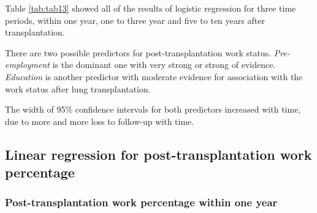 \documentclass[11pt, a4paper]{article}\usepackage[]{graphicx}\usepackage[]{color}
\begin{document}
{%
\begin{table}[ht]
\centering
\caption{Result for logistic regression 
                  for all possible periods after LTx} 
\label{tab:tab13}
\end{table}



Table \ref{tab:tab13} showed all of the results of logistic regression for three time periods, within one year, one to three year and five to ten years after transplantation. 

There are two possible predictors for post-transplantation work status. \textit{Pre-employment} is the dominant one with very strong or strong of evidence. \textit{Education} is another predictor with moderate evidence for association with the work status after lung transplantation. 

The width of 95\% confidence intervals for both predictors increased with time, due to more and more loss to follow-up with time. 


\clearpage
\subsection*{Linear regression for post-transplantation work percentage} \label{subsec:linear}
\vspace*{0.5cm}
\subsubsection*{Post-transplantation work percentage within one year} \label{subsubsection:linear1}




}
\end{document}
